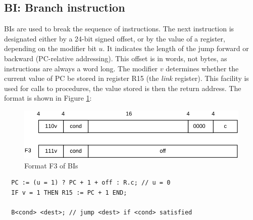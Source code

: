 \subsection{BI: Branch instruction}
BIs are used to break the sequence of instructions. The next instruction is designated either by
a 24-bit signed offset, or by the value of a register, depending on the modifier bit $u$. It
indicates the length of the jump forward or backward (PC-relative addressing). This offset is
in words, not bytes, as instructions are always a word long.  The modifier $v$ determines
whether the current value of PC be stored in register R15 (the \emph{link} register). This
facility is used for calls to procedures, the value stored is then the return address.
The format is shown in Figure \ref{fig:bi}:
\begin{figure}[h!]
  \centering
  \includegraphics[width=.9\textwidth]{i/4.png}
  \caption{Format F3 of BIs}
  \label{fig:bi}
\end{figure}
\begin{verbatim}
  PC := (u = 1) ? PC + 1 + off : R.c; // u = 0
  IF v = 1 THEN R15 := PC + 1 END;

  B<cond> <dest>; // jump <dest> if <cond> satisfied
\end{verbatim}

